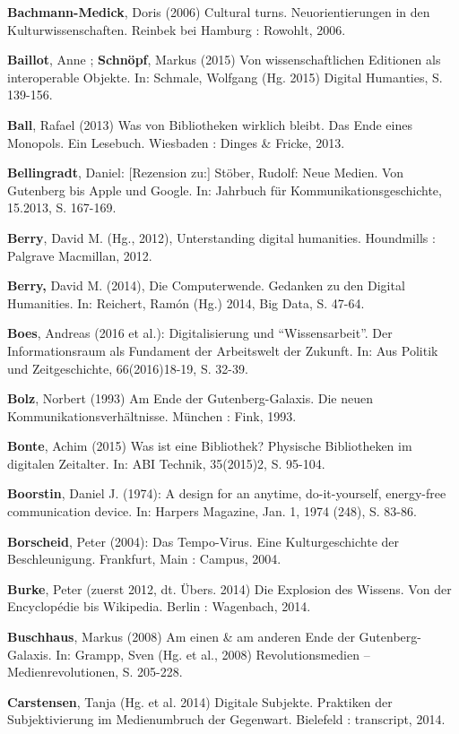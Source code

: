 \documentclass[a4paper,
fontsize=11pt,
oneside,
numbers=noperiodatend,
parskip=half-,
bibliography=totoc,
final
]{scrartcl}
\begin{document}
\textbf{Bachmann-Medick}, Doris (2006) Cultural turns. Neuorientierungen
in den Kulturwissenschaften. Reinbek bei Hamburg : Rowohlt, 2006.

\textbf{Baillot}, Anne ; \textbf{Schnöpf}, Markus (2015) Von
wissenschaftlichen Editionen als interoperable Objekte. In: Schmale,
Wolfgang (Hg. 2015) Digital Humanties, S. 139-156.

\textbf{Ball}, Rafael (2013) Was von Bibliotheken wirklich bleibt. Das
Ende eines Monopols. Ein Lesebuch. Wiesbaden : Dinges \& Fricke, 2013.

\textbf{Bellingradt}, Daniel: {[}Rezension zu:{]} Stöber, Rudolf: Neue
Medien. Von Gutenberg bis Apple und Google. In: Jahrbuch für
Kommunikationsgeschichte, 15.2013, S. 167-169.

\textbf{Berry}, David M. (Hg., 2012), Unterstanding digital humanities.
Houndmills : Palgrave Macmillan, 2012.

\textbf{Berry,} David M. (2014), Die Computerwende. Gedanken zu den
Digital Humanities. In: Reichert, Ramón (Hg.) 2014, Big Data, S. 47-64.

\textbf{Boes}, Andreas (2016 et al.): Digitalisierung und
\enquote{Wissensarbeit}. Der Informationsraum als Fundament der
Arbeitswelt der Zukunft. In: Aus Politik und Zeitgeschichte,
66(2016)18-19, S. 32-39.

\textbf{Bolz}, Norbert (1993) Am Ende der Gutenberg-Galaxis. Die neuen
Kommunikationsverhältnisse. München : Fink, 1993.

\textbf{Bonte}, Achim (2015) Was ist eine Bibliothek? Physische
Bibliotheken im digitalen Zeitalter. In: ABI Technik, 35(2015)2, S.
95-104.

\textbf{Boorstin}, Daniel J. (1974): A design for an anytime,
do-it-yourself, energy-free communication device. In: Harpers Magazine,
Jan. 1, 1974 (248), S. 83-86.

\textbf{Borscheid}, Peter (2004): Das Tempo-Virus. Eine Kulturgeschichte
der Beschleunigung. Frankfurt, Main : Campus, 2004.

\textbf{Burke}, Peter (zuerst 2012, dt. Übers. 2014) Die Explosion des
Wissens. Von der Encyclopédie bis Wikipedia. Berlin : Wagenbach, 2014.

\textbf{Buschhaus}, Markus (2008) Am einen \& am anderen Ende der
Gutenberg-Galaxis. In: Grampp, Sven (Hg. et al., 2008) Revolutionsmedien
-- Medienrevolutionen, S. 205-228.

\textbf{Carstensen}, Tanja (Hg. et al. 2014) Digitale Subjekte.
Praktiken der Subjektivierung im Medienumbruch der Gegenwart. Bielefeld
: transcript, 2014.
\end{document}
